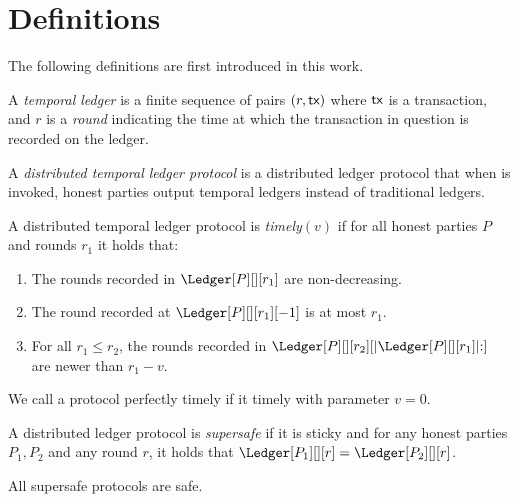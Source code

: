 
\section{Definitions}
The following definitions are first introduced in this work.

\begin{definition}
  A \emph{temporal ledger} is a finite sequence of pairs $(r, \textsf{tx})$ where $\textsf{tx}$ is
  a transaction, and $r$ is a \emph{round} indicating the time at which
  the transaction in question is recorded on the ledger.
\end{definition}

\begin{definition}
  A \emph{distributed temporal ledger protocol} is a distributed ledger protocol
  that when \rread is invoked, honest parties output temporal ledgers instead of traditional ledgers.
\end{definition}

\begin{definition}[Timely]\label{def:timely}
  A distributed temporal ledger protocol is \emph{timely}$(v)$
  if for all honest parties $P$ and rounds $r_1$ it holds that:

  \begin{enumerate}
    \item The rounds recorded in $\Ledger[P][][r_1]$ are non-decreasing.\label{def:timely-increasing}
    \item The round recorded at $\Ledger[P][][r_1][-1]$ is at most $r_1$.\label{def:timely-past}
    \item For all $r_1 \leq r_2$, the rounds recorded in $\Ledger[P][][r_2][|\Ledger[P][][r_1]|{:}]$ are
          newer than $r_1 - v$.\label{def:timely-chunk}
  \end{enumerate}
\end{definition}

We call a protocol perfectly timely if it timely with parameter $v = 0$.


\begin{definition}[Supersafety]
  A distributed ledger protocol is \emph{supersafe} if it is sticky and
  for any honest parties $P_1, P_2$ and any round $r$, it holds that
  $\Ledger[P_1][][r] = \Ledger[P_2][][r]$.
\end{definition}

All supersafe protocols are safe.
